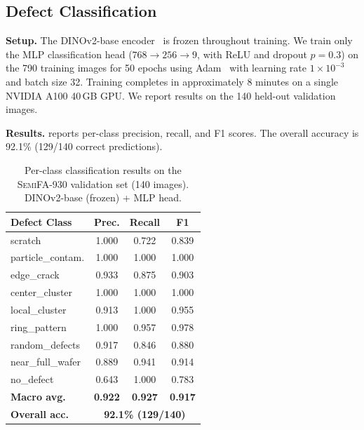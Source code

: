 \documentclass[conference]{IEEEtran}
\newcommand{\semidataset}{\textsc{SemiFA-930}}
\begin{document}
\subsection{Defect Classification}

\textbf{Setup.} The DINOv2-base encoder~\cite{oquab2024dinov2} is frozen throughout training.
We train only the MLP classification head ($768 \rightarrow 256 \rightarrow 9$, with ReLU and dropout $p=0.3$) on the 790 training images for 50 epochs using Adam~\cite{kingma2015adam} with learning rate $1 \times 10^{-3}$ and batch size 32.
Training completes in approximately 8 minutes on a single NVIDIA A100 40\,GB GPU.
We report results on the 140 held-out validation images.

\textbf{Results.}  reports per-class precision, recall, and F1 scores.
The overall accuracy is 92.1\% (129/140 correct predictions).

\begin{table}[t]
    \centering
    \caption{Per-class classification results on the \semidataset{} validation set (140 images). DINOv2-base (frozen) + MLP head.}
    \label{tab:classification}
    \begin{tabular}{@{}lccc@{}}
        \toprule
        \textbf{Defect Class} & \textbf{Prec.} & \textbf{Recall} & \textbf{F1} \\
        \midrule
        scratch              & 1.000 & 0.722 & 0.839 \\
        particle\_contam.     & 1.000 & 1.000 & 1.000 \\
        edge\_crack           & 0.933 & 0.875 & 0.903 \\
        center\_cluster       & 1.000 & 1.000 & 1.000 \\
        local\_cluster        & 0.913 & 1.000 & 0.955 \\
        ring\_pattern         & 1.000 & 0.957 & 0.978 \\
        random\_defects       & 0.917 & 0.846 & 0.880 \\
        near\_full\_wafer     & 0.889 & 0.941 & 0.914 \\
        no\_defect            & 0.643 & 1.000 & 0.783 \\
        \midrule
        \textbf{Macro avg.}  & \textbf{0.922} & \textbf{0.927} & \textbf{0.917} \\
        \textbf{Overall acc.} & \multicolumn{3}{c}{\textbf{92.1\% (129/140)}} \\
        \bottomrule
    \end{tabular}
\end{table}
\end{document}
